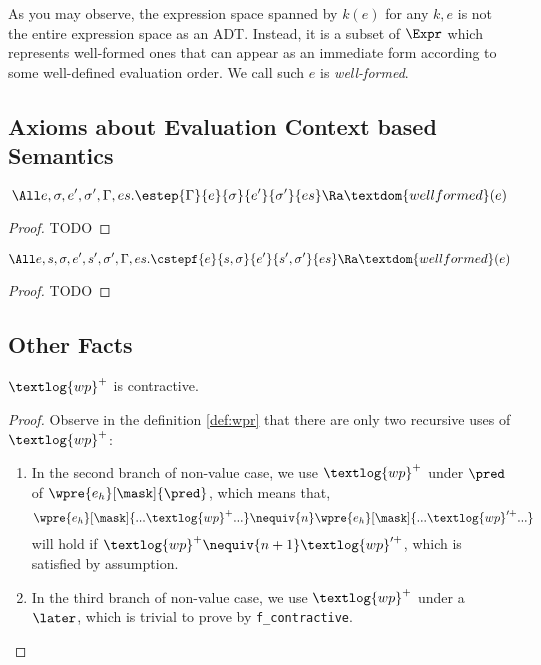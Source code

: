 As you may observe, the expression space spanned by $k(e)$ for any $k, e$ is not the entire
expression space as an ADT. Instead, it is a subset of $\Expr$ which represents well-formed ones
that can appear as an immediate form according to some well-defined evaluation order. We call
such $e$ is \emph{well-formed}.

\subsection{Axioms about Evaluation Context based Semantics}

\begin{lemma}
\[
\All e, \sigma, e', \sigma', \Gamma, es.
  \estep{\Gamma}{e}{\sigma}{e'}{\sigma'}{es} \Ra \textdom{wellformed}(e)
\]
\end{lemma}
\begin{proof}
TODO
\end{proof}

\begin{lemma}
\[
\All e, s, \sigma, e', s', \sigma', \Gamma, es.
  \cstepf{e}{s, \sigma}{e'}{s', \sigma'}{es} \Ra \textdom{wellformed}(e)
\]
\end{lemma}
\begin{proof}
TODO
\end{proof}

\subsection{Other Facts}

\begin{lemma}
$\textlog{wp}^{+}$ is contractive.
\end{lemma}
\begin{proof}
  Observe in the definition \ref{def:wpr} that there are only two recursive uses of $\textlog{wp}^{+}$:
  \begin{enumerate}
    \item In the second branch of non-value case, we use $\textlog{wp}^{+}$ under $\pred$ of $\wpre{e_h}[\mask]{\pred}$,
    which means that, 
    \[\wpre{e_h}[\mask]{ ... \textlog{wp}^{+} ... } \nequiv{n} \wpre{e_h}[\mask]{ ... \textlog{wp}'^{+} ... } \]
    will hold if \( \textlog{wp}^{+} \nequiv{n + 1} \textlog{wp}'^{+} \), which is satisfied by assumption.
    \item In the third branch of non-value case, we use $\textlog{wp}^{+}$ under a $\later$, which is trivial to prove
    by \texttt{f\_contractive}.
  \end{enumerate}
\end{proof}

